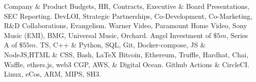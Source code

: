 
\vspace{-5mm}
\begin{cvskills}
	 {Company \& Product Budgets, HR, Contracts, Executive \& Board Presentations, SEC Reporting.}
     {DevLOI, Strategic Partnerships, Co-Development, Co-Marketing, R\&D Collaborations, Evangelism.}
     {Warner Video, Paramount Home Video, Sony Music (EMI), BMG, Universal Music, Orchard.}
     {Angel Investment of $\$5m$, Series A of $\$55m$.}
     {TS, C++ \& Python, SQL, Git, Docker-compose, JS \& NodeJS,HTML \& CSS, Bash, LaTeX}
     {Bitcoin, Ethereum, Truffle, Hardhat, Chai, Waffle, ethers.js, web3 }
     {CGP, AWS, \& Digital Ocean. Github Actions \& CircleCI.}
     {Linux, eCos, ARM, MIPS, SH3. }
    \vspace{-8mm}
\end{cvskills}

